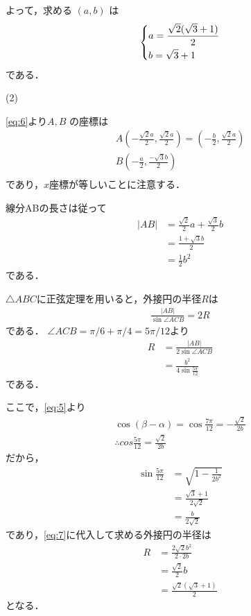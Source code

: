 \documentclass[a4paper,10pt]{ltjsarticle}
\begin{document}
\begin{multicols}{2}
  よって，求める $(a,b)$ は
  \begin{align}
    \begin{dcases}
      a = \frac{\sqrt{2}(\sqrt{3}+1)}{2} \\
      b = \sqrt{3}+1
    \end{dcases} \label{eq:6}
  \end{align}
  である．

  \vspace{10pt}
  (2)

  \cref{eq:6}より$A,B$ の座標は
  \begin{align*}
    A\left(-\frac{\sqrt{2}a}{2},\frac{\sqrt{2}a}{2}\right) = \left(-\frac{b}{2},\frac{\sqrt{2}a}{2}\right) \\
    B\left(-\frac{a}{2},\frac{-\sqrt{3}b}{2}\right)                                                        \\
  \end{align*}
  であり，$x$座標が等しいことに注意する．

  線分ABの長さは従って
  \begin{align*}
    |AB|
     & = \frac{\sqrt{2}}{2}a + \frac{\sqrt{3}}{2}b \\
     & = \frac{1+\sqrt{3}b}{2}                     \\
     & = \frac{1}{2}b^2
  \end{align*}
  である．

  $\triangle ABC$に正弦定理を用いると，外接円の半径$R$は
  \begin{align*}
    \frac{|AB|}{\sin\angle ACB} = 2R
  \end{align*}
  である．
  $\angle ACB=\pi/6+\pi/4=5\pi/12$より
  \begin{align}
    R
     & = \frac{|AB|}{2\sin\angle ACB}                  \\
     & = \frac{b^2}{4\sin\frac{5\pi}{12}} \label{eq:7}
  \end{align}
  である．

  ここで，\cref{eq:5}より
  \begin{align*}
    \cos\left(\beta-\alpha\right) = \cos\frac{7\pi}{12} = -\frac{\sqrt{2}}{2b} \\
    \therefore
    cos\frac{5\pi}{12} = \frac{\sqrt{2}}{2b}
  \end{align*}
  だから，
  \begin{align*}
    \sin\frac{5\pi}{12}
     & = \sqrt{1-\frac{1}{2b^2}}      \\
     & = \frac{\sqrt{3}+1}{2\sqrt{2}} \\
     & = \frac{b}{2\sqrt{2}}
  \end{align*}
  であり，\cref{eq:7}に代入して求める外接円の半径は
  \begin{align*}
    R
     & = \frac{2\sqrt{2}b^2}{2 \cdot 2b} \\
     & = \frac{\sqrt{2}}{2}b             \\
     & = \frac{\sqrt{2}(\sqrt{3}+1)}{2}
  \end{align*}
  となる．



\end{multicols}
\end{document}
